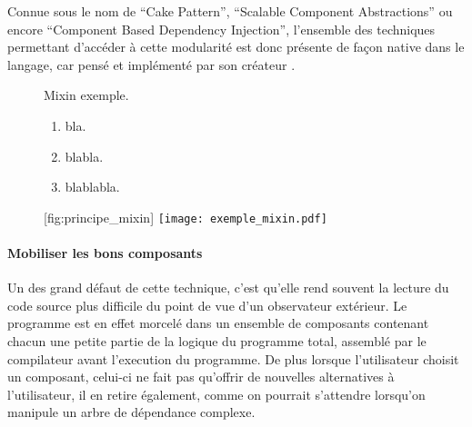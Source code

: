 
Connue sous le nom de \foreignquote{english}{Cake Pattern}, \foreignquote{english}{Scalable Component Abstractions} ou encore \foreignquote{english}{Component Based Dependency Injection}, l'ensemble des techniques permettant d'accéder à cette modularité est donc présente de façon native dans le langage, car pensé et implémenté par son créateur \autocite{Oderskyxx}.


\begin{figure}[!htbp]
	\begin{sidecaption}[fortoc]{Mixin exemple. \parbox{\marginparwidth}{
	\begin{enumerate}[label=(\alph*),labelindent=\parindent,leftmargin=*]
	        \item bla. 
	        \item blabla.
	        \item blablabla.
	\end{enumerate}}}[fig:principe_mixin]
  		\centering
		\texttt{[image: exemple\_mixin.pdf]}{
		}
  \end{sidecaption}
\end{figure}



\paragraph{Mobiliser les bons composants}

Un des grand défaut de cette technique, c'est qu'elle rend souvent la lecture du code source plus difficile du point de vue d'un observateur extérieur. Le programme est en effet morcelé dans un ensemble de composants contenant chacun une petite partie de la logique du programme total, assemblé par le compilateur avant l'execution du programme. De plus lorsque l'utilisateur choisit un composant, celui-ci ne fait pas qu'offrir de nouvelles alternatives à l'utilisateur, il en retire également, comme on pourrait s'attendre lorsqu'on manipule un arbre de dépendance complexe.

